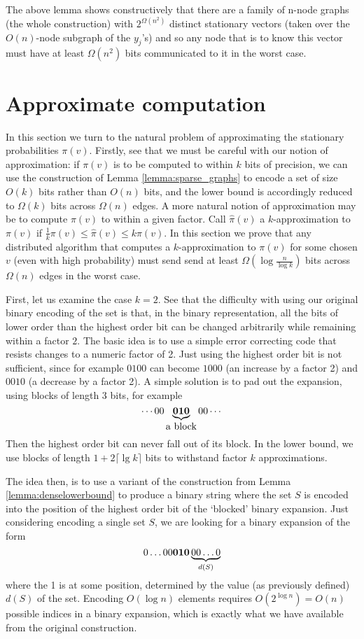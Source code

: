 \documentclass[twocolumn]{article}
\begin{document}
The above lemma shows constructively that there are a family of n-node graphs (the whole construction) with $2^{\Omega(n^2)}$ distinct stationary vectors (taken over the $O(n)$-node subgraph of the $y_j$'s) and so any node that is to know this vector must have at least $\Omega(n^2)$ bits communicated to it in the worst case.

\section{Approximate computation}
\label{section:approximation}
In this section we turn to the natural problem of approximating the stationary probabilities $\pi(v)$. Firstly, see that we must be careful with our notion of approximation: if $\pi(v)$ is to be computed to within $k$ bits of precision, we can use the construction of Lemma \ref{lemma:sparse_graphs} to encode a set of size $O(k)$ bits rather than $O(n)$ bits, and the lower bound is accordingly reduced to $\Omega(k)$ bits across $\Omega(n)$ edges. A more natural notion of approximation may be to compute $\pi(v)$ to within a given factor. Call $\hat\pi(v)$ a $k$-approximation to $\pi(v)$ if $\frac{1}{k} \pi(v) \leq \hat \pi(v) \leq k \pi(v)$. In this section we prove that any distributed algorithm that computes a $k$-approximation to $\pi(v)$ for some chosen $v$ (even with high probability) must send send at least $\Omega(\log \frac{n}{\log k})$ bits across $\Omega(n)$ edges in the worst case.

First, let us examine the case $k=2$. See that the difficulty with using our original binary encoding of the set is that, in the binary representation, all the bits of lower order than the highest order bit can be changed arbitrarily while remaining within a factor $2$. The basic idea is to use a simple error correcting code that resists changes to a numeric factor of 2. Just using the highest order bit is not sufficient, since for example $0100$ can become $1000$ (an increase by a factor 2) and $0010$ (a decrease by a factor 2). A simple solution is to pad out the expansion, using blocks of length 3 bits, for example $$\cdots00\underbrace{{\bf 010}}_{\mbox{a block}}00\cdots$$ Then the highest order bit can never fall out of its block. In the lower bound, we use blocks of length $1 + 2 \lceil \lg k \rceil$ bits to withstand factor $k$ approximations.

The idea then, is to use a variant of the construction from Lemma \ref{lemma:denselowerbound} to produce a binary string where the set $S$ is encoded into the position of the highest order bit of the `blocked' binary expansion. Just considering encoding a single set $S$, we are looking for a binary expansion of the form $$0\ldots 00{\bf 010}\underbrace{00 \ldots 0}_{d(S)}$$ where the 1 is at some position, determined by the value (as previously defined) $d(S)$ of the set. Encoding $O(\log n)$ elements requires $O(2^{\log n}) = O(n)$ possible indices in a binary expansion, which is exactly what we have available from the original construction.
\end{document}
